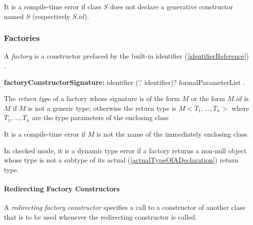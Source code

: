 \documentclass{article}
\begin{document}
\LMHash{}
It is a compile-time error if class $S$ does not declare a generative constructor named $S$ (respectively $S.id$).


\subsubsection{Factories}

\LMHash{}
A {\em factory} is a constructor prefaced by the built-in identifier (\ref{identifierReference}) \FACTORY{}.

\begin{grammar}
{\bf factoryConstructorSignature:}\FACTORY{} identifier (`{\escapegrammar .}' identifier)? formalParameterList
  .
\end{grammar}


\LMHash{}
The {\em return type} of a factory whose signature is of the form \FACTORY{} $M$ or the form \FACTORY{} $M.id$ is $M$ if $M$ is not a generic type; otherwise the return type is $M <T_1, \ldots, T_n>$ where $T_1, \ldots, T_n$ are the type parameters of the enclosing class

\LMHash{}
It is a compile-time error if $M$ is not the name of the immediately enclosing class.

\LMHash{}
In checked mode, it is a dynamic type error if a factory returns a non-null object whose type is not a subtype of its actual (\ref{actualTypeOfADeclaration}) return type.




\paragraph{Redirecting Factory Constructors}

\LMHash{}
A {\em redirecting factory constructor} specifies a call to a constructor of another class that is to be used whenever the redirecting constructor is called.
\end{document}
